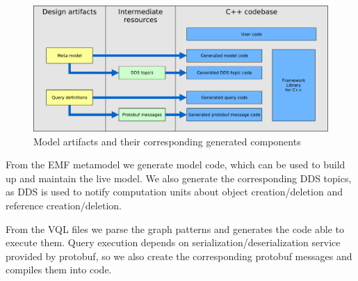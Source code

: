 \begin{figure}[H]
	\begin{center}
		\includegraphics[width=\textwidth]{figures/workflow.pdf}
		\caption{ Model artifacts and their corresponding generated components }
		\label{fig:workflow}
	\end{center}
\end{figure}

From the EMF metamodel we generate model code, which can be used to build up and maintain the live model. 
We also generate the corresponding DDS topics, as DDS is used to notify computation units about object creation/deletion and reference creation/deletion.

From the VQL files we parse the graph patterns and generates the code able to execute them.
Query execution depends on serialization/deserialization service provided by protobuf, so we also create the corresponding protobuf messages and compiles them into \cpp{} code.

